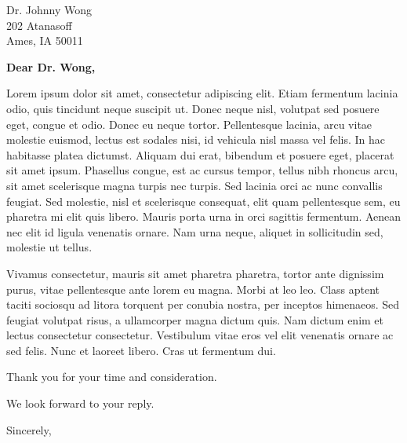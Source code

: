 \documentclass{letter}
\begin{document}

\begin{letter}{Dr. Johnny Wong \\ 202 Atanasoff \\ Ames, IA 50011}


\opening{\textbf{Dear Dr. Wong,}}

Lorem ipsum dolor sit amet, consectetur adipiscing elit. Etiam fermentum lacinia odio, quis tincidunt neque suscipit ut. Donec neque nisl, volutpat sed posuere eget, congue et odio. Donec eu neque tortor. Pellentesque lacinia, arcu vitae molestie euismod, lectus est sodales nisi, id vehicula nisl massa vel felis. In hac habitasse platea dictumst. Aliquam dui erat, bibendum et posuere eget, placerat sit amet ipsum. Phasellus congue, est ac cursus tempor, tellus nibh rhoncus arcu, sit amet scelerisque magna turpis nec turpis. Sed lacinia orci ac nunc convallis feugiat. Sed molestie, nisl et scelerisque consequat, elit quam pellentesque sem, eu pharetra mi elit quis libero. Mauris porta urna in orci sagittis fermentum. Aenean nec elit id ligula venenatis ornare. Nam urna neque, aliquet in sollicitudin sed, molestie ut tellus.

Vivamus consectetur, mauris sit amet pharetra pharetra, tortor ante dignissim purus, vitae pellentesque ante lorem eu magna. Morbi at leo leo. Class aptent taciti sociosqu ad litora torquent per conubia nostra, per inceptos himenaeos. Sed feugiat volutpat risus, a ullamcorper magna dictum quis. Nam dictum enim et lectus consectetur consectetur. Vestibulum vitae eros vel elit venenatis ornare ac sed felis. Nunc et laoreet libero. Cras ut fermentum dui.

Thank you for your time and consideration.

We look forward to your reply.

\closing{Sincerely,}




\end{letter}
\end{document}
